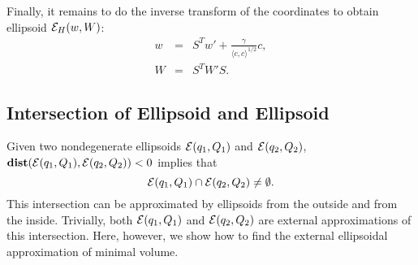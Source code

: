 Finally, it remains to do the inverse transform of the coordinates
to obtain ellipsoid $\EE_H(w,W)$:
\begin{eqnarray*}
w & = & S^Tw' + \frac{\gamma}{\langle c,c\rangle^{1/2}}c, \\
W & = & S^TW'S.
\end{eqnarray*}


\subsection{Intersection of Ellipsoid and Ellipsoid}
Given two nondegenerate ellipsoids $\EE(q_1,Q_1)$ and $\EE(q_2,Q_2)$,
${\bf dist}(\EE(q_1,Q_1),\EE(q_2,Q_2))<0$ implies that
\[ \EE(q_1,Q_1)\cap\EE(q_2,Q_2)\neq\emptyset .\]
This intersection can be approximated by ellipsoids from the outside and
from the inside.
Trivially, both  $\EE(q_1,Q_1)$ and $\EE(q_2,Q_2)$ are external approximations
of this intersection.
Here, however, we show how to find the external ellipsoidal approximation
of minimal volume.

